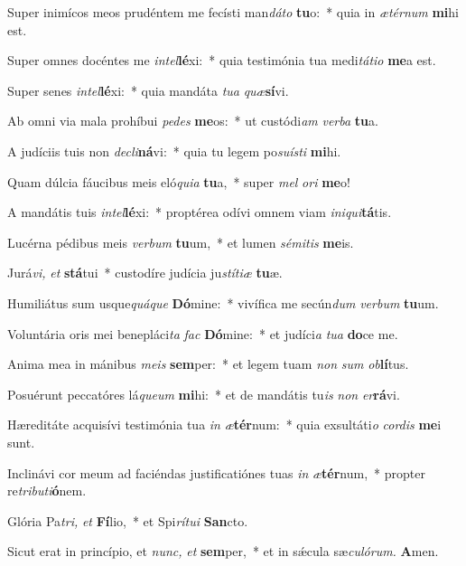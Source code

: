 \item Super inimícos meos prudéntem me fecísti man\tinyhspace\textit{dáto} \textbf{tu}o:~* quia in \textit{ætérnum} \textbf{mi}hi est.
\item Super omnes docéntes me \textit{intel}\textbf{lé}xi:~* quia testimónia tua medi\tinyhspace\textit{tátio} \textbf{me}a est.
\item Super senes \textit{intel}\textbf{lé}xi:~* quia mandáta \textit{tua} \textit{quæ}\textbf{sí}vi.
\item Ab omni via mala prohíbui \textit{pedes} \textbf{me}os:~* ut custódi\textit{am} \textit{verba} \textbf{tu}a.
\item A judíciis tuis non \textit{decli}\textbf{ná}vi:~* quia tu legem po\tinyhspace\textit{suísti} \textbf{mi}hi.
\item Quam dúlcia fáucibus meis eló\textit{quia} \textbf{tu}a,~* super \textit{mel} \textit{ori} \textbf{me}o!
\item A mandátis tuis \textit{intel}\textbf{lé}xi:~* proptérea odívi omnem viam \textit{iniqui}\textbf{tá}tis.
\item Lucérna pédibus meis \textit{verbum} \textbf{tu}um,~* et lumen \textit{sémitis} \textbf{me}is.
\item Jurá\textit{vi,} \textit{et} \textbf{stá}tui~* custodíre judícia ju\tinyhspace\textit{stítiæ} \textbf{tu}æ.
\item Humiliátus sum usque\tinyhspace\textit{quáque} \textbf{Dó}mine:~* vivífica me secún\textit{dum} \textit{verbum} \textbf{tu}um.
\item Voluntária oris mei benepláci\tinyhspace\textit{ta} \textit{fac} \textbf{Dó}mine:~* et judíci\tinyhspace\textit{a} \textit{tua} \textbf{do}ce me.
\item Anima mea in mánibus \textit{meis} \textbf{sem}per:~* et legem tuam \textit{non} \textit{sum} \textit{ob}\textbf{lí}tus.
\item Posuérunt peccatóres lá\tinyhspace\textit{queum} \textbf{mi}hi:~* et de mandátis tu\textit{is} \textit{non} \textit{er}\textbf{rá}vi.
\item Hæreditáte acquisívi testimónia tua \textit{in} \textit{æ}\textbf{tér}num:~* quia exsultáti\tinyhspace\textit{o} \textit{cordis} \textbf{me}i sunt.
\item Inclinávi cor meum ad faciéndas justificatiónes tuas \textit{in} \textit{æ}\textbf{tér}num,~* propter re\textit{tributi}\textbf{ó}nem.
\item Glória Pa\tinyhspace\textit{tri,} \textit{et} \textbf{Fí}lio,~* et Spi\tinyhspace\textit{rítui} \textbf{San}cto.
\item Sicut erat in princípio, et \textit{nunc,} \textit{et} \textbf{sem}per,~* et in sǽcula sæ\tinyhspace\textit{culórum.} \textbf{A}men.